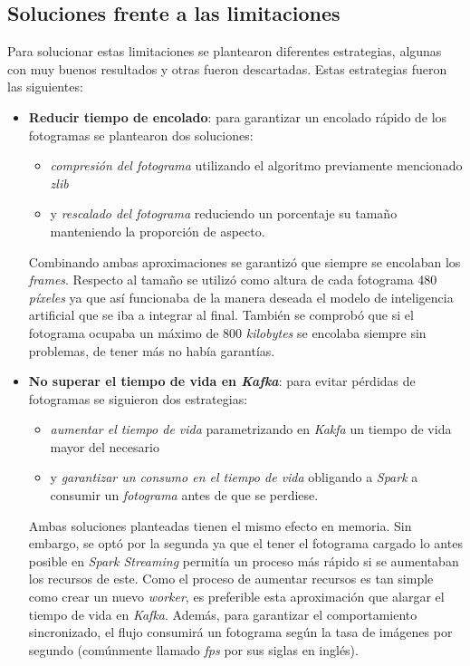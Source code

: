 \subsection{Soluciones frente a las limitaciones}

Para solucionar estas limitaciones se plantearon diferentes estrategias, algunas con muy buenos resultados y otras fueron descartadas. Estas estrategias fueron las siguientes:

\begin{itemize}
	\item \textbf{Reducir tiempo de encolado}: para garantizar un encolado rápido de los fotogramas se plantearon dos soluciones:
	\begin{itemize}
		\item \textit{compresión del fotograma} utilizando el algoritmo previamente mencionado \textit{zlib}~\cite{tool:zlib}
		\item y \textit{rescalado del fotograma} reduciendo un porcentaje su tamaño manteniendo la proporción de aspecto.
	\end{itemize}
	Combinando ambas aproximaciones se garantizó que siempre se encolaban los \textit{frames}. Respecto al tamaño se utilizó como altura de cada fotograma 480 \textit{píxeles} ya que así funcionaba de la manera deseada
	el modelo de inteligencia artificial que se iba a integrar al final. También se comprobó que si el fotograma ocupaba un máximo de 800 \textit{kilobytes} se encolaba siempre sin problemas, de tener más no había garantías.
	\item \textbf{No superar el tiempo de vida en \textit{Kafka}}: para evitar pérdidas de fotogramas se siguieron dos estrategias:
	\begin{itemize}
		\item \textit{aumentar el tiempo de vida} parametrizando en \textit{Kakfa} un tiempo de vida mayor del necesario
		\item y \textit{garantizar un consumo en el tiempo de vida} obligando a \textit{Spark} a consumir un \textit{fotograma} antes de que se perdiese.
	\end{itemize}
	Ambas soluciones planteadas tienen el mismo efecto en memoria. Sin embargo, se optó por la segunda ya que el tener el fotograma cargado lo antes posible en \textit{Spark Streaming} permitía un proceso más rápido si se aumentaban los recursos de este. Como el proceso de aumentar recursos es tan simple como crear un nuevo \textit{worker}, es preferible esta aproximación que alargar el tiempo de vida en \textit{Kafka}. Además, para garantizar el comportamiento sincronizado, el flujo consumirá un fotograma según la tasa de imágenes por segundo (comúnmente llamado \textit{fps} por sus siglas en inglés).

\end{itemize}

